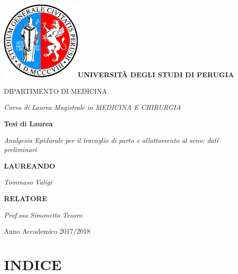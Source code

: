 \documentclass[]{article}
\date{}
\begin{document}
\includegraphics[width=1.58268in,height=1.5748in]{./media/image1.png}\textbf{UNIVERSITÀ
DEGLI STUDI DI PERUGIA}

DIPARTIMENTO DI MEDICINA

\emph{Corso di Laurea Magistrale in} \emph{MEDICINA E CHIRURGIA}

\textbf{Tesi di Laurea}

\emph{Analgesia Epidurale per il travaglio di parto e allattamento al
seno: dati preliminari}

\textbf{LAUREANDO}

\emph{Tommaso Valigi}

\textbf{RELATORE}

\emph{Prof.ssa Simonetta Tesoro}

Anno Accademico 2017/2018

\hypertarget{indice}{%
\section{INDICE}\label{indice}}
\end{document}
